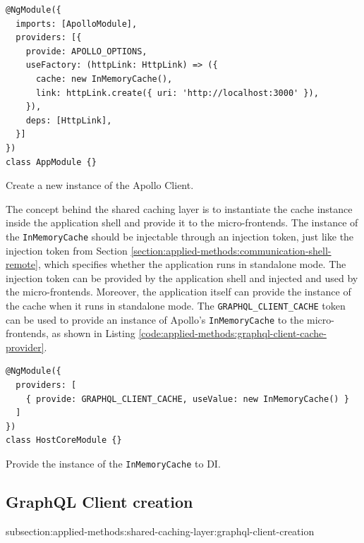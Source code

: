\ifshowListings
\begin{listing}[H]
\begin{verbatim}
@NgModule({
  imports: [ApolloModule],
  providers: [{
    provide: APOLLO_OPTIONS,
    useFactory: (httpLink: HttpLink) => ({
      cache: new InMemoryCache(),
      link: httpLink.create({ uri: 'http://localhost:3000' }),
    }),
    deps: [HttpLink],
  }]
})
class AppModule {}
\end{verbatim}
\caption{Create a new instance of the Apollo Client.}\label{code:applied-methods:creating-the-apollo-client}
\end{listing}
\fi

\noindent The concept behind the shared caching layer is to instantiate the cache instance inside the application shell and provide it to the micro-frontends. The instance of the \texttt{InMemoryCache} should be injectable through an injection token, just like the injection token from Section \ref{section:applied-methods:communication-shell-remote}, which specifies whether the application runs in standalone mode. The injection token can be provided by the application shell and injected and used by the micro-frontends. Moreover, the application itself can provide the instance of the cache when it runs in standalone mode. The \texttt{GRAPHQL\_CLIENT\_CACHE} token can be used to provide an instance of Apollo's \texttt{InMemoryCache} to the micro-frontends, as shown in Listing \ref{code:applied-methods:graphql-client-cache-provider}.

\ifshowListings
\begin{listing}[H]
\begin{verbatim}
@NgModule({
  providers: [
    { provide: GRAPHQL_CLIENT_CACHE, useValue: new InMemoryCache() }
  ]
})
class HostCoreModule {}
\end{verbatim}
\caption{Provide the instance of the \texttt{InMemoryCache} to \ac{DI}.}\label{code:applied-methods:graphql-client-cache-provider}
\end{listing}
\fi

\subsection{GraphQL Client creation}{subsection:applied-methods:shared-caching-layer:graphql-client-creation}

